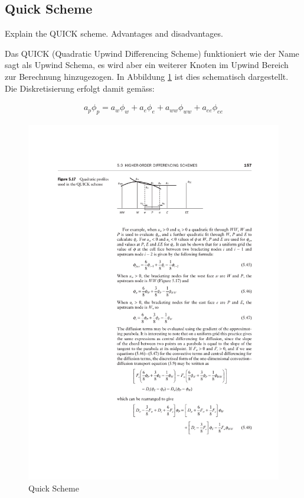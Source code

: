 \documentclass[a4paper]{scrartcl}
\begin{document}
\subsection{Quick Scheme} Explain the QUICK scheme. Advantages and
disadvantages.

Das QUICK (Quadratic Upwind Differencing Scheme) funktioniert wie der Name sagt
als Upwind Schema, es wird aber ein weiterer Knoten im Upwind Bereich
zur Berechnung hinzugezogen. In Abbildung \ref{fig:56} ist dies schematisch
dargestellt. Die Diskretisierung erfolgt damit gemäss:

\begin{align}
\boxed{a_p\phi_p=a_w\phi_w+a_e\phi_e+a_{ww}\phi_{ww}+a_{ee}\phi_{ee}}
\end{align}

\begin{figure}[h!]
\begin{center}
\includegraphics[scale=1.0]{images/56.pdf}
\caption{Quick Scheme}
\label{fig:56}
\end{center}
\end{figure}
\end{document}
